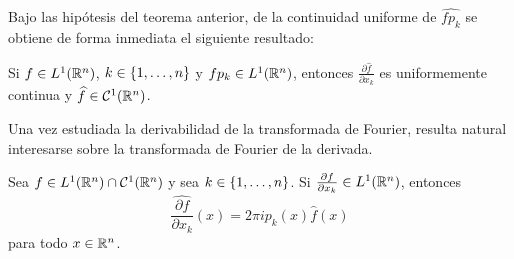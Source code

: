 \documentclass[a4paper, 11pt, oneside]{report}
\begin{document}
Bajo las hipótesis del teorema anterior, de la continuidad uniforme de $\widehat{fp_k}$ se obtiene de forma inmediata el siguiente resultado:

\begin{corollary}
  Si $f \in L^1(\mathbb R^n)$, $k \in \{1,\mathellipsis,n\}$ y $fp_k \in L^1(\mathbb R^n)$, entonces $\frac{\partial \widehat{f}}{\partial x_k}$ es uniformemente continua y $\widehat{f} \in \mathcal{C}^1(\mathbb R^n)$.
\end{corollary}

Una vez estudiada la derivabilidad de la transformada de Fourier, resulta natural interesarse sobre la transformada de Fourier de la derivada. 

\begin{theorem}\label{teo:3.1.8}
  Sea $f \in L^1(\mathbb R^n) \cap \mathcal{C}^1(\mathbb R^n)$ y sea $k \in \{1,\mathellipsis,n\}$. Si $\frac{\partial f}{\partial x_k} \in L^1(\mathbb R^n)$, entonces
  \[\widehat{\frac{\partial f}{\partial x_k}}(x) = 2 \pi i p_k(x)\widehat{f}(x)\]
  para todo $x \in \mathbb R^n$.
\end{theorem}
\end{document}
